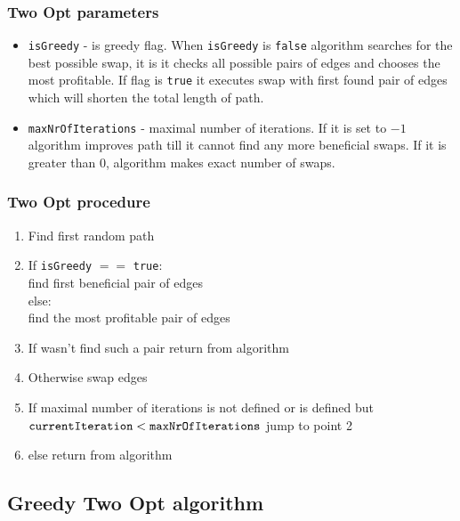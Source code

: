 \documentclass[titlepage]{article}
\begin{document}
\subsubsection{Two Opt parameters}

\begin{itemize}
	\item \texttt{isGreedy} - is greedy flag. When \texttt{isGreedy} is \texttt{false} algorithm searches for the best possible swap, it is it checks all possible pairs of edges and chooses the most profitable. If flag is \texttt{true} it executes swap with first found pair of edges which will shorten the total length of path.
	
	\item \texttt{maxNrOfIterations} - maximal number of iterations. If it is set to $-1$ algorithm improves path till it cannot find any more beneficial swaps. If it is greater than $0$, algorithm makes exact number of swaps.
	
\end{itemize}

\subsubsection{Two Opt procedure}

\begin{enumerate}
	\item Find first random path
	\item If \texttt{isGreedy} $==$ \texttt{true}: \\
	\hspace*{5mm} find first beneficial pair of edges \\
	else:\\
	\hspace*{5mm} find the most profitable pair of edges
	\item If wasn't find such a pair return from algorithm
	\item Otherwise swap edges
	\item If maximal number of iterations is not defined or is defined but $\mbox{\texttt{currentIteration}} < \mbox{\texttt{maxNrOfIterations}}$ jump to point 2
	\item else return from algorithm
\end{enumerate}


\subsection{Greedy Two Opt algorithm}
\end{document}
